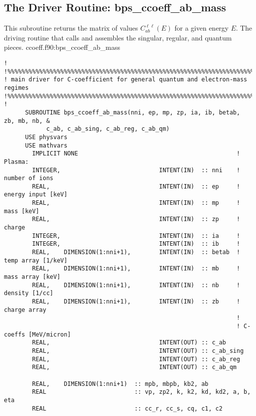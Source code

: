 \documentclass[preprint,12pt,eqsecnum,nofootinbib,amsmath,amssymb]{revtex4}
\begin{document}
\subsection{The Driver Routine:
\lowercase{bps}\_\lowercase{ccoeff}\_\lowercase{ab}\_\lowercase{mass}}

This subroutine returns the matrix of values $C^{\ell\ell}_{ab}(E)$ for a
given energy $E$. The driving routine that calls and assembles the
singular, regular, and quantum pieces.  
\vskip0.4cm
\noindent
ccoeff.f90:bps\_ccoeff\_ab\_mass
{
\baselineskip 10pt
\begin{verbatim}
!
!%%%%%%%%%%%%%%%%%%%%%%%%%%%%%%%%%%%%%%%%%%%%%%%%%%%%%%%%%%%%%%%%%%%%%%%%%%%%
! main driver for C-coefficient for general quantum and electron-mass regimes
!%%%%%%%%%%%%%%%%%%%%%%%%%%%%%%%%%%%%%%%%%%%%%%%%%%%%%%%%%%%%%%%%%%%%%%%%%%%%
!
      SUBROUTINE bps_ccoeff_ab_mass(nni, ep, mp, zp, ia, ib, betab, zb, mb, nb, &
            c_ab, c_ab_sing, c_ab_reg, c_ab_qm)
      USE physvars
      USE mathvars    
        IMPLICIT NONE                                             ! Plasma:
        INTEGER,                            INTENT(IN)  :: nni    !  number of ions
        REAL,                               INTENT(IN)  :: ep     !  energy input [keV]
        REAL,                               INTENT(IN)  :: mp     !  mass [keV]
        REAL,                               INTENT(IN)  :: zp     !  charge
        INTEGER,                            INTENT(IN)  :: ia     !  
        INTEGER,                            INTENT(IN)  :: ib     !  
        REAL,    DIMENSION(1:nni+1),        INTENT(IN)  :: betab  !  temp array [1/keV]
        REAL,    DIMENSION(1:nni+1),        INTENT(IN)  :: mb     !  mass array [keV]
        REAL,    DIMENSION(1:nni+1),        INTENT(IN)  :: nb     !  density [1/cc]
        REAL,    DIMENSION(1:nni+1),        INTENT(IN)  :: zb     !  charge array
                                                                  !
                                                                  ! C-coeffs [MeV/micron]
        REAL,                               INTENT(OUT) :: c_ab
        REAL,                               INTENT(OUT) :: c_ab_sing
        REAL,                               INTENT(OUT) :: c_ab_reg
        REAL,                               INTENT(OUT) :: c_ab_qm

        REAL,    DIMENSION(1:nni+1)  :: mpb, mbpb, kb2, ab
        REAL                         :: vp, zp2, k, k2, kd, kd2, a, b, eta
        REAL                         :: cc_r, cc_s, cq, c1, c2


\end{verbatim}}
\end{document}
